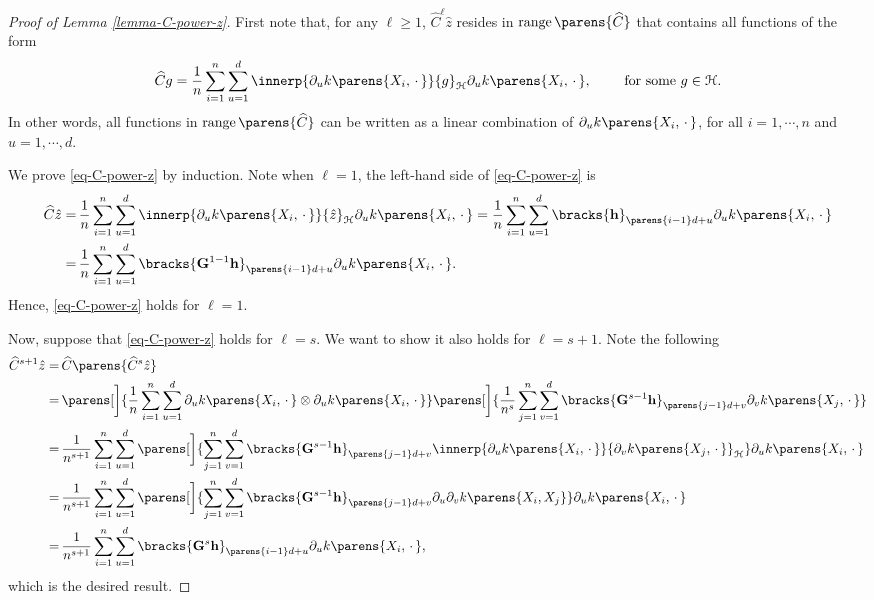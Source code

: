 \begin{proof}[Proof of Lemma \ref{lemma-C-power-z}]
	First note that, for any $\ell \ge 1$, $\widehat{C}^{\ell} \hat{z}$ resides in $\range \parens{\widehat{C}}$ that contains all functions of the form 
	\begin{align*}
		\widehat{C} g = \frac{1}{n} \sum_{i=1}^n \sum_{u=1}^d \innerp{\partial_u k \parens{X_i, \,\cdot\,}}{g}_{\calH} \partial_u k \parens{X_i, \,\cdot\,}, \qquad \text{ for some } g \in \calH. 
	\end{align*}	
	In other words, all functions in $\range \parens{\widehat{C}}$ can be written as a linear combination of $\partial_u k \parens{X_i, \,\cdot\,}$, for all $i = 1, \cdots, n$ and $u = 1, \cdots, d$. 
	
	We prove \eqref{eq-C-power-z} by induction. Note when $\ell = 1$, the left-hand side of \eqref{eq-C-power-z} is 
	\begin{align*}
		\widehat{C} \hat{z} = & \, \frac{1}{n} \sum_{i=1}^n \sum_{u=1}^d \innerp{\partial_u k \parens{X_i, \,\cdot\,}}{\hat{z}}_{\calH} \partial_u k \parens{X_i, \,\cdot\,} 
		= \frac{1}{n} \sum_{i=1}^n \sum_{u=1}^d \bracks{\bh}_{\parens{i-1}d+u} \partial_u k \parens{X_i, \,\cdot\,} \\ 
		= & \, \frac{1}{n} \sum_{i=1}^n \sum_{u=1}^d \bracks{\bG^{1-1} \bh}_{\parens{i-1}d+u} \partial_u k \parens{X_i, \,\cdot\,}. 
	\end{align*}
	Hence, \eqref{eq-C-power-z} holds for $\ell = 1$. 
	
	Now, suppose that \eqref{eq-C-power-z} holds for $\ell = s$. We want to show it also holds for $\ell = s + 1$. Note the following 
	\begin{align*}
		\widehat{C}^{s+1} \hat{z} = & \, \widehat{C} \parens{\widehat{C}^{s} \hat{z}} \\ 
		= & \, \parens[\bigg]{\frac{1}{n} \sum_{i=1}^n \sum_{u=1}^d \partial_u k \parens{X_i, \,\cdot\,} \otimes \partial_u k\parens{X_i, \,\cdot\,}} \parens[\bigg]{\frac{1}{n^{s}} \sum_{j=1}^n \sum_{v=1}^d \bracks{\bG^{s-1} \bh}_{\parens{j-1}d+v} \partial_v k \parens{X_j, \,\cdot\,}} \\ 
		= & \, \frac{1}{n^{s+1}} \sum_{i=1}^n \sum_{u=1}^d \parens[\bigg]{\sum_{j=1}^n \sum_{v=1}^d \bracks{\bG^{s-1} \bh}_{\parens{j-1}d+v} \innerp{\partial_u k \parens{X_i, \,\cdot\,}}{\partial_v k\parens{X_j, \,\cdot\,}}_{\calH}} \partial_u k \parens{X_i, \,\cdot\,} \\ 
		= & \, \frac{1}{n^{s+1}} \sum_{i=1}^n \sum_{u=1}^d \parens[\bigg]{\sum_{j=1}^n \sum_{v=1}^d \bracks{\bG^{s-1} \bh}_{\parens{j-1}d+v} \partial_u \partial_v k \parens{X_i, X_j}} \partial_u k \parens{X_i, \,\cdot\,} \\ 
		= & \, \frac{1}{n^{s+1}} \sum_{i=1}^n \sum_{u=1}^d \bracks{\bG^{s} \bh}_{\parens{i-1}d+u} \partial_u k \parens{X_i, \,\cdot\,}, 
	\end{align*}
	which is the desired result. 
\end{proof}

